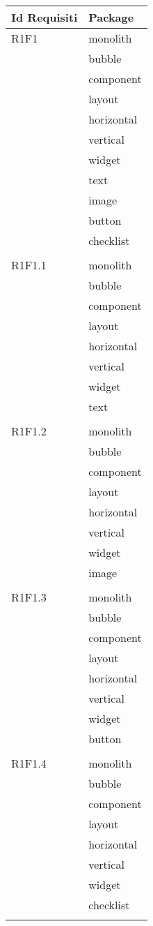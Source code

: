 \begin{center}
	\begin{longtable}{|p{7cm}|p{7cm}|}\hline
		Id Requisiti & Package \\ \hline
		R1F1 & monolith \\ & bubble \\ & component \\ & layout \\ & horizontal \\ & vertical \\ & widget \\ & text \\ & image \\ & button \\ & checklist \\ & \\ \hline
		R1F1.1 & monolith \\ & bubble \\ & component \\ & layout \\ & horizontal \\ & vertical \\ & widget \\ & text \\ & \\ \hline
		R1F1.2 & monolith \\ & bubble \\ & component \\ & layout \\ & horizontal \\ & vertical \\ & widget \\ & image \\ & \\ \hline
		R1F1.3 & monolith \\ & bubble \\ & component \\ & layout \\ & horizontal \\ & vertical \\ & widget \\ & button \\ & \\ \hline
		R1F1.4 & monolith \\ & bubble \\ & component \\ & layout \\ & horizontal \\ & vertical \\ & widget \\ & checklist \\ & \\ \hline

\end{longtable}
\end{center}
